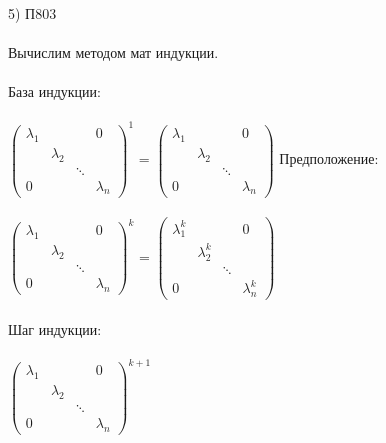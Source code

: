 \documentclass[12pt, a4paper]{article}
\begin{document}
	\\\\\\
	5) П803
	\\\\
	Вычислим методом мат индукции. 
	\\\\
	База индукции:
	\\\\
	\begin{math}
		\left(
		\begin{array}{rrrr}
			\lambda_1 &  &  & 0 \\
			 & \lambda_2 &  &  \\
			 & & \ddots &\\
			 0 & & & \lambda_n
		\end{array} 
		\right ) ^1
	\end{math}
	= 
	\begin{math}
		\left(
		\begin{array}{rrrr}
			\lambda_1 &  &  & 0 \\
			& \lambda_2 &  &  \\
			& & \ddots &\\
			0 & & & \lambda_n
		\end{array} 
		\right )
	\end{math}
	\newpage
	Предположение:
	\\\\
	\begin{math}
		\left(
		\begin{array}{rrrr}
			\lambda_1 &  &  & 0 \\
			& \lambda_2 &  &  \\
			& & \ddots &\\
			0 & & & \lambda_n
		\end{array} 
		\right ) ^k
	\end{math}
	=
	\begin{math}
		\left(
		\begin{array}{rrrr}
			\lambda_1^k &  &  & 0 \\
			& \lambda_2^k &  &  \\
			& & \ddots &\\
			0 & & & \lambda_n^k
		\end{array} 
		\right )
	\end{math}
	\\\\
	Шаг индукции:
	\\\\
	\begin{math}
		\left(
		\begin{array}{rrrr}
			\lambda_1 &  &  & 0 \\
			& \lambda_2 &  &  \\
			& & \ddots &\\
			0 & & & \lambda_n
		\end{array} 
		\right ) ^{k + 1}
	\end{math}
\end{document}
